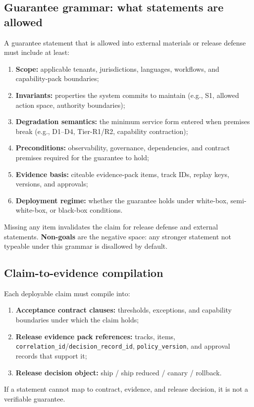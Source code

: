 \documentclass[11pt,a4paper]{report}
\begin{document}
\subsection{Guarantee grammar: what statements are allowed}
A guarantee statement that is allowed into external materials or release defense must include at least:
\begin{enumerate}
  \item \textbf{Scope:} applicable tenants, jurisdictions, languages, workflows, and capability-pack boundaries;
  \item \textbf{Invariants:} properties the system commits to maintain (e.g., S1, allowed action space, authority boundaries);
  \item \textbf{Degradation semantics:} the minimum service form entered when premises break (e.g., D1--D4, Tier-R1/R2, capability contraction);
  \item \textbf{Preconditions:} observability, governance, dependencies, and contract premises required for the guarantee to hold;
  \item \textbf{Evidence basis:} citeable evidence-pack items, track IDs, replay keys, versions, and approvals;
  \item \textbf{Deployment regime:} whether the guarantee holds under white-box, semi-white-box, or black-box conditions.
\end{enumerate}
\noindent Missing any item invalidates the claim for release defense and external statements. \textbf{Non-goals} are the negative space: any stronger statement not typeable under this grammar is disallowed by default.

\subsection{Claim-to-evidence compilation}
Each deployable claim must compile into:
\begin{enumerate}
  \item \textbf{Acceptance contract clauses:} thresholds, exceptions, and capability boundaries under which the claim holds;
  \item \textbf{Release evidence pack references:} tracks, items, \texttt{correlation\_id}/\texttt{decision\_record\_id}, \texttt{policy\_version}, and approval records that support it;
  \item \textbf{Release decision object:} ship / ship reduced / canary / rollback.
\end{enumerate}
\noindent If a statement cannot map to contract, evidence, and release decision, it is not a verifiable guarantee.
\end{document}
